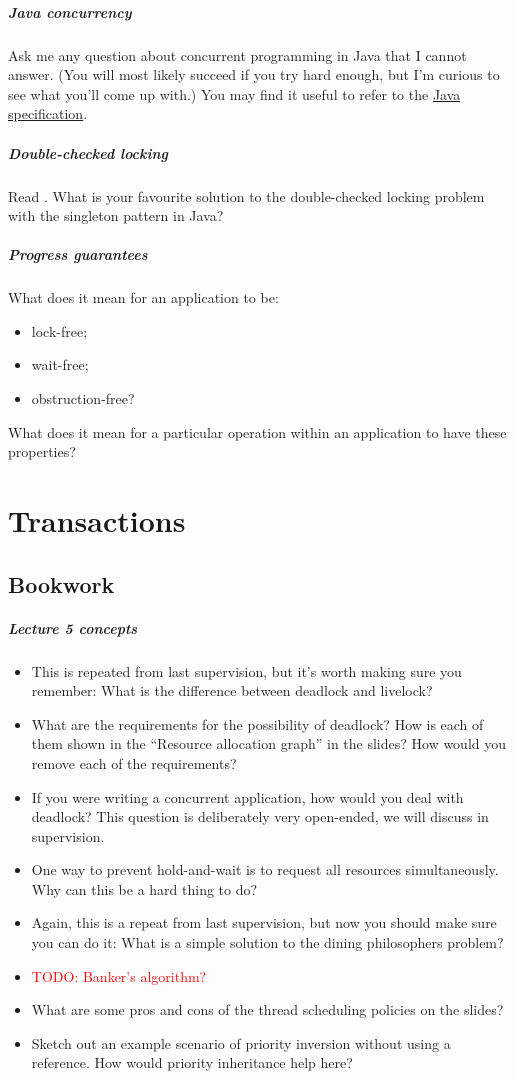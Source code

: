 \documentclass[12pt,a4paper,oneside,openright]{report}
\newcommand{\question}[2]{\paragraph{#1} #2}
\newcommand{\todo}[1]{\textcolor{red}{TODO: #1}}
\begin{document}
\question{Java concurrency}{Ask me any question about concurrent
  programming in Java that I cannot answer. (You will most likely
  succeed if you try hard enough, but I'm curious to see what you'll
  come up with.) You may find it useful to refer to the
  \href{https://docs.oracle.com/javase/specs/jls/se15/html/jls-17.html}{Java
    specification}.}

\question{Double-checked locking}{Read \cite{DCL}. What is your
  favourite solution to the double-checked locking problem with the
  singleton pattern in Java?}

\question{Progress guarantees}{What does it mean for an application to
  be:
  \begin{itemize}
  \item lock-free;
  \item wait-free;
  \item obstruction-free?
  \end{itemize}
  What does it mean for a particular operation within an application
  to have these properties?  }

\chapter{Transactions}

\section{Bookwork}

\question{Lecture 5 concepts}{
  \begin{itemize}
  \item This is repeated from last supervision, but it's worth making
    sure you remember: What is the difference between deadlock and
    livelock?
  \item What are the requirements for the possibility of deadlock? How
    is each of them shown in the ``Resource allocation graph'' in the
    slides? How would you remove each of the requirements?
  \item If you were writing a concurrent application, how would you
    deal with deadlock? This question is deliberately very open-ended,
    we will discuss in supervision.
  \item One way to prevent hold-and-wait is to request all resources
    simultaneously. Why can this be a hard thing to do?
  \item Again, this is a repeat from last supervision, but now you
    should make sure you can do it: What is a simple solution to the
    dining philosophers problem?
  \item \todo{Banker's algorithm?}
  \item What are some pros and cons of the thread scheduling policies
    on the slides?
  \item Sketch out an example scenario of priority inversion without
    using a reference. How would priority inheritance help here?
  \end{itemize}
}
\end{document}
